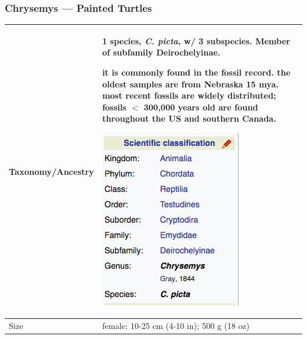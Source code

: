 \subsubsection{Chrysemys --- Painted Turtles}
\begin{center}
\begin{longtabu} to 

	\hline
	Taxonomy/Ancestry &
	1 species, \emph{C. picta}, w/ 3 subspecies. Member of subfamily Deirochelyinae.
	
	it is commonly found in the fossil record. the oldest samples are from Nebraska 15 mya. most recent fossils are widely distributed; fossils $<$ 300,000 years old are found throughout the US and southern Canada. 
	
	\begin{center} \includegraphics[scale=0.5]{testudines/emydidae/chrysemys/tax} \end{center}
	 \\
	\hline
	Size & 
	female: 10-25 cm (4-10 in); 500 g (18 oz)
	

\end{longtabu}
\end{center}

